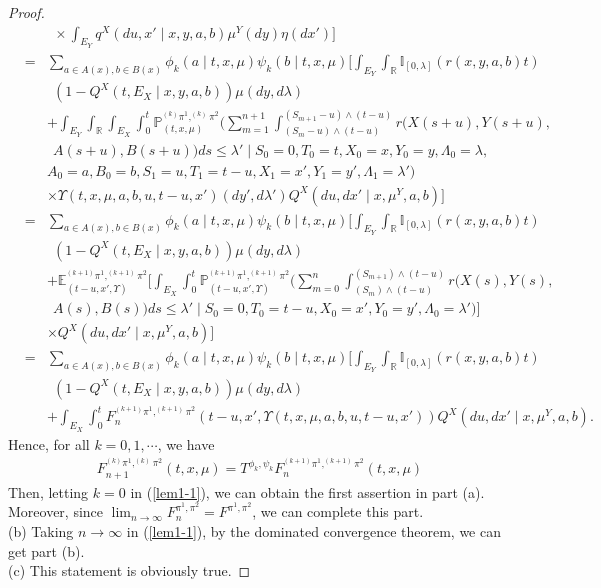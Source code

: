 \documentclass[12pt]{article}
\begin{document}
\begin{proof}
\begin{eqnarray*}
&&~~\times \int_{E_Y}q^X(du,x'\mid x,y,a,b)\mu^Y(dy)\eta(dx')\bigg]\\
&=&\sum_{a\in A(x), b\in B(x)}\phi_k(a\mid t,x,\mu)\psi_k(b\mid t,x,\mu)
\bigg[\int_{E_Y}\int_{\mathbb{R}}\mathbb{I}_{[0,\lambda]}(r(x,y,a,b)t)\\
&&~~(1-Q^X(t,E_X\mid x,y,a,b))\mu(dy,d\lambda)\\
&&+\int_{E_Y}\int_{\mathbb{R}}\int_{E_X}\int_0^t
\mathbb{P}^{^{(k)}\pi^1,^{(k)}\pi^2}_{(t,x,\mu)}
(\sum_{m=1}^{n+1}\int_{(S_m-u)\wedge (t-u)}^{(S_{m+1}-u)\wedge (t-u)} r(X(s+u),Y(s+u),\\
&&~~A(s+u),B(s+u))ds\leq \lambda'\mid S_0=0,T_0=t,X_0=x,Y_0=y,\Lambda_0=\lambda,\\
&&A_0=a,B_0=b,S_1=u,T_1=t-u,X_1=x',Y_1=y',\Lambda_1=\lambda')\\
&&\times \Upsilon(t,x,\mu,a,b,u,t-u,x')(dy',d\lambda')
Q^X(du,dx'\mid x,\mu^Y,a,b)\bigg]\\
&=&\sum_{a\in A(x), b\in B(x)}\phi_k(a\mid t,x,\mu)\psi_k(b\mid t,x,\mu)
\big[\int_{E_Y}\int_{\mathbb{R}}\mathbb{I}_{[0,\lambda]}(r(x,y,a,b)t)\\
&&~~(1-Q^X(t,E_X\mid x,y,a,b))\mu(dy,d\lambda)\\
&&+\mathbb{E}_{(t-u,x',\Upsilon)}^{^{(k+1)}\pi^1,^{(k+1)}\pi^2}
\bigg[\int_{E_X}\int_0^t\mathbb{P}_{(t-u,x',\Upsilon)}^{^{(k+1)}\pi^1,^{(k+1)}\pi^2}
(\sum_{m=0}^{n}\int_{(S_m)\wedge (t-u)}^{(S_{m+1})\wedge (t-u)} r(X(s),Y(s),\\
&&~~A(s),B(s))ds\leq \lambda'\mid S_0=0,T_0=t-u,X_0=x',Y_0=y',\Lambda_0=\lambda')\big]\\
&&\times Q^X(du,dx'\mid x,\mu^Y,a,b)\bigg]\\
&=&\sum_{a\in A(x), b\in B(x)}\phi_k(a\mid t,x,\mu)\psi_k(b\mid t,x,\mu)
\big[\int_{E_Y}\int_{\mathbb{R}}\mathbb{I}_{[0,\lambda]}(r(x,y,a,b)t)\\
&&~~(1-Q^X(t,E_X\mid x,y,a,b))\mu(dy,d\lambda)\\
&&+\int_{E_X}\int_0^t F_n^{^{(k+1)}\pi^1,^{(k+1)}\pi^2}
(t-u,x',\Upsilon(t,x,\mu,a,b,u,t-u,x'))Q^X(du,dx'\mid x,\mu^Y,a,b).
\end{eqnarray*}
Hence, for all $k=0,1,\cdots$, we have
\begin{eqnarray}\label{lem1-1}
F_{n+1}^{^{(k)}\pi^1,^{(k)}\pi^2}(t,x,\mu)
=T^{\phi_k,\psi_k}F_n^{^{(k+1)}\pi^1,^{(k+1)}\pi^2}
(t,x,\mu)
\end{eqnarray}
Then, letting $k=0$ in (\ref{lem1-1}), we can obtain the first assertion in part (a).
Moreover, since $\lim_{n\to\infty}F_{n}^{\pi^1,\pi^2}=F^{\pi^1,\pi^2}$,
we can complete this part.
\\(b) Taking $n\to\infty$ in (\ref{lem1-1}), by the dominated convergence theorem, we can get part (b).
\\(c) This statement is obviously true.
\end{proof}
\end{document}
